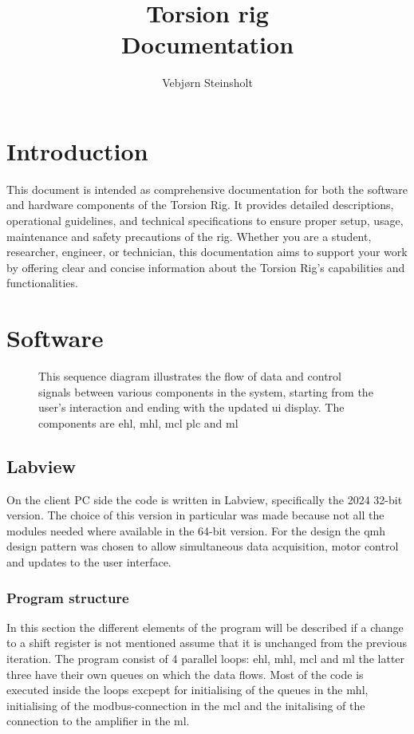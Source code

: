 \documentclass{ol-softwaremanual}
\title{Torsion rig \\Documentation}
\author{Vebjørn Steinsholt}
\begin{document}
\maketitle

\tableofcontents
\listoffigures
\newpage

\section{Introduction}

This document is intended as comprehensive documentation for both the software and hardware components of the Torsion Rig. It provides detailed descriptions, operational guidelines, and technical specifications to ensure proper setup, usage, maintenance and safety precautions of the rig. Whether you are a student, researcher, engineer, or technician, this documentation aims to support your work by offering clear and concise information about the Torsion Rig’s capabilities and functionalities.
\section{Software}
\begin{figure}[H]
\centerline{}
\caption{This sequence diagram illustrates the flow of data and control signals between various components in the system, starting from the user’s interaction and ending with the updated \acrshort{ui} display. The components are \acrfull{ehl}, \acrfull{mhl}, \acrfull{mcl} \acrfull{plc} and \acrfull{ml}}
\label{fig: example}
\end{figure}
\subsection{Labview}
On the client PC side the code is written in Labview, specifically the 2024 32-bit version. The choice of this version in particular was made because not all the modules needed where available in the 64-bit version. For the design the \acrfull{qmh} design pattern was chosen to allow simultaneous data acquisition, motor control and updates to the user interface. 
\subsubsection{Program structure}
In this section the different elements of the program will be described if a change to a shift register is not mentioned assume that it is unchanged from the previous iteration. The program consist of 4 parallel loops: \acrlong{ehl}, \acrlong{mhl}, \acrlong{mcl} and \acrlong{ml} the latter three have their own queues on which the data flows. Most of the code is executed inside the loops excpept for initialising of the queues in the \acrshort{mhl}, initialising of the \gls{modbus}-connection in the \acrshort{mcl} and the initalising of the connection to the amplifier in the \acrshort{ml}.
\end{document}
